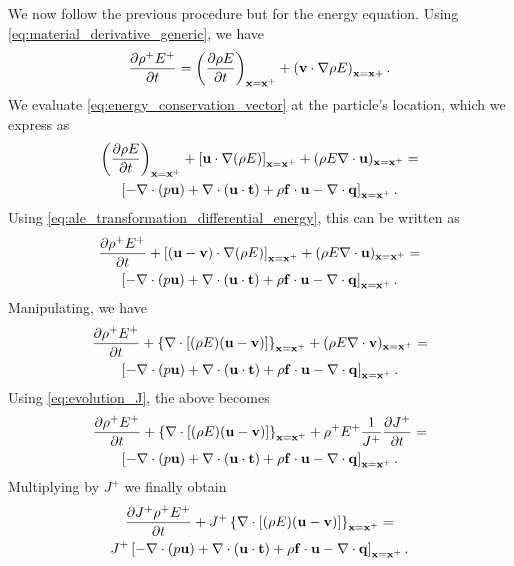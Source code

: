 \documentclass[oneside,a4paper,11pt]{report}
\begin{document}
We now follow the previous procedure but for the energy equation. Using \cref{eq:material_derivative_generic}, we have
\begin{equation}
\label{eq:ale_transformation_differential_energy}
    \frac{\partial \rho^+ E^+}{\partial t} = \left ( \frac{\partial \rho E}{\partial t} \right )_{\mathbf{x} = \mathbf{x}^+} + \left(\mathbf{v} \cdot \nabla \rho E \right)_{\mathbf{x} = \mathbf{x} +}.
\end{equation}
We evaluate \cref{eq:energy_conservation_vector} at the particle's location, which we express as
\begin{multline}
\left ( \frac{\partial \rho E}{\partial t} \right )_{\mathbf{x} = \mathbf{x}^+} + \left [ \mathbf{u} \cdot \nabla (\rho E) \right]_{\mathbf{x} = \mathbf{x}^+} + (\rho E \nabla \cdot \mathbf{u})_{\mathbf{x} = \mathbf{x}^+} = \\
\left [ -\nabla \cdot (p \mathbf{u}) + \nabla \cdot (\mathbf{u} \cdot \mathbf{t}) + \rho \mathbf{f} \cdot \mathbf{u} - \nabla \cdot \mathbf{q} \right ]_{\mathbf{x} = \mathbf{x}^+}.
\end{multline}
Using \cref{eq:ale_transformation_differential_energy}, this can be written as
\begin{multline}
\frac{\partial \rho^+ E^+}{\partial t} + \left [ (\mathbf{u} - \mathbf{v}) \cdot \nabla (\rho E) \right]_{\mathbf{x} = \mathbf{x}^+} + (\rho E \nabla \cdot \mathbf{u})_{\mathbf{x} = \mathbf{x}^+} = \\
\left [ -\nabla \cdot (p \mathbf{u}) + \nabla \cdot (\mathbf{u} \cdot \mathbf{t}) + \rho \mathbf{f} \cdot \mathbf{u} - \nabla \cdot \mathbf{q} \right ]_{\mathbf{x} = \mathbf{x}^+}.
\end{multline}
Manipulating, we have
\begin{multline}
\frac{\partial \rho^+ E^+}{\partial t} + \left \{ \nabla \cdot [ (\rho E) (\mathbf{u} - \mathbf{v}) ] \right \}_{\mathbf{x} = \mathbf{x}^+} + (\rho E \nabla \cdot \mathbf{v})_{\mathbf{x} = \mathbf{x}^+} = \\
\left [ -\nabla \cdot (p \mathbf{u}) + \nabla \cdot (\mathbf{u} \cdot \mathbf{t}) + \rho \mathbf{f} \cdot \mathbf{u} - \nabla \cdot \mathbf{q} \right ]_{\mathbf{x} = \mathbf{x}^+}.
\end{multline}
Using \cref{eq:evolution_J}, the above becomes
\begin{multline}
\frac{\partial \rho^+ E^+}{\partial t} + \left \{ \nabla \cdot [ (\rho E) (\mathbf{u} - \mathbf{v}) ] \right \}_{\mathbf{x} = \mathbf{x}^+} + \rho^+ E^+ \frac{1}{J^+} \frac{\partial J^+}{\partial t} = \\
\left [ -\nabla \cdot (p \mathbf{u}) + \nabla \cdot (\mathbf{u} \cdot \mathbf{t}) + \rho \mathbf{f} \cdot \mathbf{u} - \nabla \cdot \mathbf{q} \right ]_{\mathbf{x} = \mathbf{x}^+}.
\end{multline}
Multiplying by $J^+$ we finally obtain
\begin{multline}
\frac{\partial J^+ \rho^+ E^+}{\partial t} + J^+ \left \{ \nabla \cdot [ (\rho E) (\mathbf{u} - \mathbf{v}) ] \right \}_{\mathbf{x} = \mathbf{x}^+} = \\
J^+ \left [ -\nabla \cdot (p \mathbf{u}) + \nabla \cdot (\mathbf{u} \cdot \mathbf{t}) + \rho \mathbf{f} \cdot \mathbf{u} - \nabla \cdot \mathbf{q} \right ]_{\mathbf{x} = \mathbf{x}^+}.
\end{multline}
\end{document}
